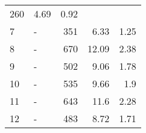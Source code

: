 \begin{longtable}{lXrrr}
       \num{260} &
       \num[round-mode=places,round-precision=2]{4.69} &
         \num[round-mode=places,round-precision=2]{0.92} \\

     7 &
     \multicolumn{1}{X}{ -  } &


       \num{351} &
       \num[round-mode=places,round-precision=2]{6.33} &
         \num[round-mode=places,round-precision=2]{1.25} \\

     8 &
     \multicolumn{1}{X}{ -  } &


       \num{670} &
       \num[round-mode=places,round-precision=2]{12.09} &
         \num[round-mode=places,round-precision=2]{2.38} \\

     9 &
     \multicolumn{1}{X}{ -  } &


       \num{502} &
       \num[round-mode=places,round-precision=2]{9.06} &
         \num[round-mode=places,round-precision=2]{1.78} \\

     10 &
     \multicolumn{1}{X}{ -  } &


       \num{535} &
       \num[round-mode=places,round-precision=2]{9.66} &
         \num[round-mode=places,round-precision=2]{1.9} \\

     11 &
     \multicolumn{1}{X}{ -  } &


       \num{643} &
       \num[round-mode=places,round-precision=2]{11.6} &
         \num[round-mode=places,round-precision=2]{2.28} \\

     12 &
     \multicolumn{1}{X}{ -  } &


       \num{483} &
       \num[round-mode=places,round-precision=2]{8.72} &
         \num[round-mode=places,round-precision=2]{1.71} \\


\end{longtable}
